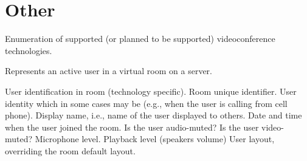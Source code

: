 \section{Other} \label{sect:common:other}

\begin{Api}

Enumeration of supported (or planned to be supported) videoconference technologies.
\begin{ApiEnumValues}
\end{ApiEnumValues}

Represents an active user in a virtual room on a server.
\begin{ApiClassAttributes}
User identification in room (technology specific).
Room unique identifier. 
User identity which in some cases may be  (e.g., when the user is calling from cell phone).
 Display name, i.e., name of the user displayed to others.
 Date and time when the user joined the room.
Is the user audio-muted?
Is the user video-muted?
Microphone level.
Playback level (speakers volume)
User layout, overriding the room default layout.
\end{ApiClassAttributes}

\end{Api}

